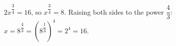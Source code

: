 $2x^{\dfrac{3}{4}}=16$, so $x^{\dfrac{3}{4}}=8$. Raising both sides to the power $\dfrac{4}{3}$: $x=8^{\dfrac{4}{3}}=\left(8^{\dfrac{1}{3}}\right)^4=2^4=\boxed{16}$.
